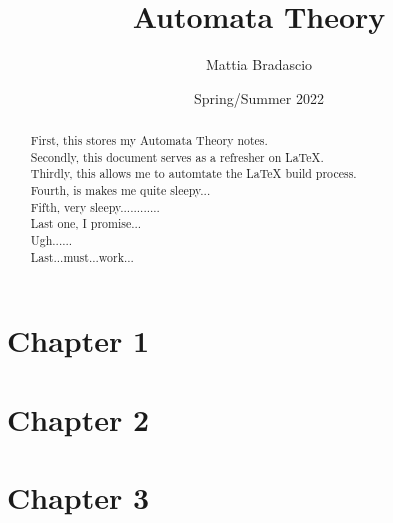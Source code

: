 \documentclass[12pt, letterpaper]{article}
\title{Automata Theory}
\author{Mattia Bradascio}
\date{Spring/Summer 2022}
\begin{document}
\begin{titlepage}
\maketitle
\end{titlepage}

\begin{abstract}

    First, this stores my Automata Theory notes. \\
    \indent Secondly, this document serves as a refresher on LaTeX. \\
    \indent Thirdly, this allows me to automtate the LaTeX build process. \\ 
    \indent Fourth, is makes me quite sleepy... \\
    \indent Fifth, very sleepy............ \\
    \indent Last one, I promise... \\
    \indent Ugh...... \\
    \indent Last...must...work...

\end{abstract}

\section{Chapter 1}


\section{Chapter 2}


\section{Chapter 3}

\end{document}
